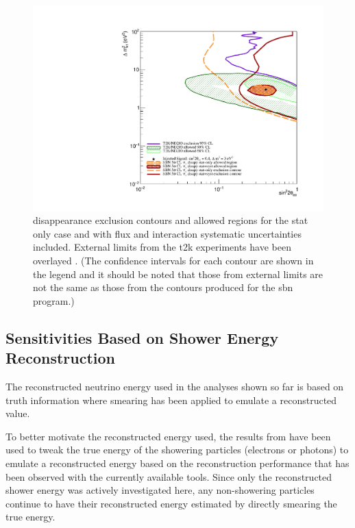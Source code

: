\begin{figure}
    \centering
    \includegraphics[width = \largefigwidth]{figures-chap6/overlays/valor_overlays_nue_disapp.pdf}
    \caption[\nue disappearance contours with external limits.]{\nue disappearance exclusion contours and allowed regions for the stat only case and with flux and interaction systematic uncertainties included. External limits from the \gls{t2k} experiments have been overlayed \cite{T2K_nue_disapp_contour}. (The confidence intervals for each contour are shown in the legend and it should be noted that those from external limits are not the same as those from the contours produced for the \gls{sbn} program.)}
    \label{fig:nue_disapp_global_sensitivity}
\end{figure}

\newpage
\subsection{\texorpdfstring{\nue Sensitivities Based on Shower Energy Reconstruction}{nue Sensitivities Based on Shower Energy Reconstruction}}

The reconstructed neutrino energy used in the analyses shown so far is based on truth information where smearing has been applied to emulate a reconstructed value. 

To better motivate the reconstructed energy used, the results from  have been used to tweak the true energy of the showering particles (electrons or photons) to emulate a reconstructed energy based on the reconstruction performance that has been observed with the currently available tools. Since only the reconstructed shower energy was actively investigated here, any non-showering particles continue to have their reconstructed energy estimated by directly smearing the true energy. 

